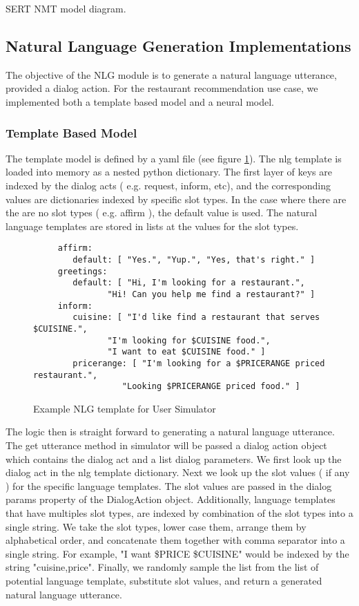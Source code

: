 SERT NMT model diagram.



\subsection{Natural Language Generation Implementations}

The objective of the NLG module is to generate a natural language utterance, provided a dialog action. For the restaurant recommendation use case, we implemented both a template based model and a neural model. 

\subsubsection{Template  Based Model}

The template model is defined by a yaml file (see figure \ref{fig:res_nlg}). The nlg template is loaded into memory as a nested python dictionary. The first layer of keys are indexed by the dialog acts ( e.g. request, inform, etc), and the corresponding values are dictionaries indexed by specific slot types. In the case where there are the are no slot types ( e.g. affirm ), the default value is used. The natural language templates are stored in lists at the values for the slot types.

\begin{figure}[h!]
	\caption{ Example NLG template for User Simulator }
	\label{fig:res_nlg}
	\begin{lstlisting}
	 affirm:
		default: [ "Yes.", "Yup.", "Yes, that's right." ]
	 greetings:
		default: [ "Hi, I'm looking for a restaurant.",
			   "Hi! Can you help me find a restaurant?" ]
	 inform:
		cuisine: [ "I'd like find a restaurant that serves $CUISINE.",
			   "I'm looking for $CUISINE food.",
			   "I want to eat $CUISINE food." ]
		pricerange: [ "I'm looking for a $PRICERANGE priced restaurant.",
			      "Looking $PRICERANGE priced food." ]	
	\end{lstlisting}
\end{figure}

The logic then is straight forward to generating a natural language utterance. The get utterance method in simulator will be passed a dialog action object which contains the dialog act and a list dialog parameters. We first look up the dialog act in the nlg template dictionary. Next we look up the slot values ( if any ) for the specific language templates. The slot values are passed in the dialog params property of the DialogAction object. Additionally, language templates that have multiples slot types, are indexed by combination of the slot types into a single string. We take the slot types, lower case them, arrange them by alphabetical order, and concatenate them together with comma separator into a single string. For example, "I want \$PRICE \$CUISINE" would be indexed by the string "cuisine,price". Finally, we randomly sample the list from the list of potential language template, substitute slot values, and return a generated natural language utterance. 


